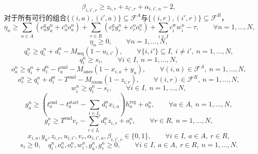 \documentclass[11pt,a4paper]{article}
\begin{document}
\begin{equation}
\beta_{i,i',r} \ge z_{i,r} + z_{i',r} + \alpha_{i,i',a} - 2,
\tag{M15}
\end{equation}
对于所有可行的组合$\{(i,a),(i',a)\}\subseteq \mathcal{F}^A$与$\{(i,r),(i',r)\}\subseteq \mathcal{F}^R$，
\begin{equation}
\eta_n \ge
\sum_{a \in A} \left(c_a^{\mathrm g} g_a^n + c_a^{\mathrm o} o_a^n\right)
+ \sum_{r \in R} \left(c_r^{\mathrm g} g_r^n + c_r^{\mathrm o} o_r^n\right)
+ \sum_{i \in I} c_i^{\mathrm w} w_i^n
- \tau,
\qquad \forall n=1,\dots,N,
\tag{M16}
\end{equation}
\begin{equation}
\eta_n \ge 0,
\qquad \forall n=1,\dots,N,
\tag{M17}
\end{equation}
\begin{equation}
q_{i'}^n \ge q_i^n + d_i^n - M_{\mathrm{seq}}(1-u_{i,i'}),
\qquad
\forall \{i,i'\}\subseteq I,\ i\neq i',\ n=1,\dots,N,
\tag{M18}
\end{equation}
\begin{equation}
q_i^n \ge s_i,
\qquad \forall i \in I,\ n=1,\dots,N,
\tag{M19}
\end{equation}
\begin{equation}
o_a^n \ge q_i^n + d_i^n - t_a^{\mathrm{end}} - M_{\mathrm{anes}}(1-x_{i,a}+y_a),
\qquad
\forall (i,a)\in \mathcal{F}^A,\ n=1,\dots,N,
\tag{M20}
\end{equation}
\begin{equation}
o_r^n \ge q_i^n + d_i^n - T^{\mathrm{end}} - M_{\mathrm{room}}(1-z_{i,r}),
\qquad
\forall (i,r)\in \mathcal{F}^R,\ n=1,\dots,N,
\tag{M21}
\end{equation}
\begin{equation}
w_i^n \ge q_i^n - s_i,
\qquad \forall i \in I,\ n=1,\dots,N,
\tag{M22}
\end{equation}
\begin{equation}
g_a^n \ge
\left(t_a^{\mathrm{end}} - t_a^{\mathrm{start}} - \sum_{i \in I_a} d_i^n x_{i,a}\right) h_a^{\mathrm{reg}}
+ o_a^n,
\qquad \forall a \in A,\ n=1,\dots,N,
\tag{M23}
\end{equation}
\begin{equation}
g_r^n \ge
T^{\mathrm{end}} v_r - \sum_{i \in I_r} d_i^n z_{i,r} + o_r^n,
\qquad \forall r \in R,\ n=1,\dots,N,
\tag{M24}
\end{equation}
\begin{equation}
x_{i,a}, y_a, z_{i,r}, u_{i,i'}, v_r, \alpha_{i,i',a}, \beta_{i,i',r} \in \{0,1\},
\qquad \forall i \in I,\ a \in A,\ r \in R,
\tag{M25}
\end{equation}
\begin{equation}
s_i \ge 0,
\quad
q_i^n, o_a^n, o_r^n, w_i^n, g_a^n, g_r^n \ge 0,
\qquad \forall i \in I,\ a \in A,\ r \in R,\ n=1,\dots,N.
\tag{M26}
\end{equation}
\end{document}
